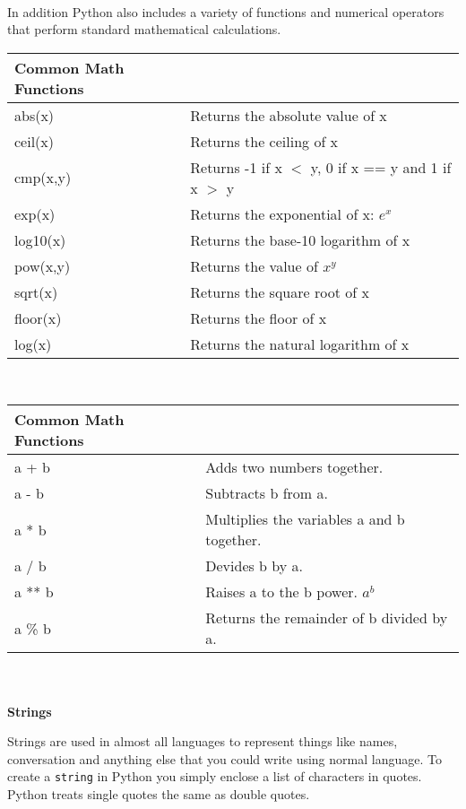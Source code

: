 \documentclass[letterpaper,11pt]{article}
\begin{document}
\\
\par{In addition Python also includes a variety of functions and numerical
operators that perform standard mathematical calculations.}
\\
\begin{tabular}[t]{l l}
    \textbf{Common Math Functions} &                               \\
    \hline
    abs(x)   & Returns the absolute value of x                     \\
    ceil(x)  & Returns the ceiling of x                            \\
    cmp(x,y) & Returns -1 if x $<$ y, 0 if x == y and 1 if x $>$ y \\
    exp(x)   & Returns the exponential of x: $e^x$                 \\
    log10(x) & Returns the base-10 logarithm of x                  \\
    pow(x,y) & Returns the value of $x^y$                          \\
    sqrt(x)  & Returns the square root of x                        \\
    floor(x) & Returns the floor of x                              \\
    log(x)   & Returns the natural logarithm of x                  \\
\end{tabular}
\\
\begin{tabular}[t]{l l}
    \textbf{Common Math Functions} &                               \\
    \hline
    a + b  & Adds two numbers together.                 \\
    a - b  & Subtracts b from a.                        \\
    a * b  & Multiplies the variables a and b together. \\
    a / b  & Devides b by a.                            \\
    a ** b & Raises a to the b power. $a^b$             \\
    a \% b & Returns the remainder of b divided by a.   \\
\end{tabular}
\\ \\
\textbf{Strings}
\par{Strings are used in almost all languages to represent things like names,
conversation and anything else that you could write using normal language. To
create a \texttt{string} in Python you simply enclose a list of characters in
quotes. Python treats single quotes the same as double quotes.}
\end{document}
